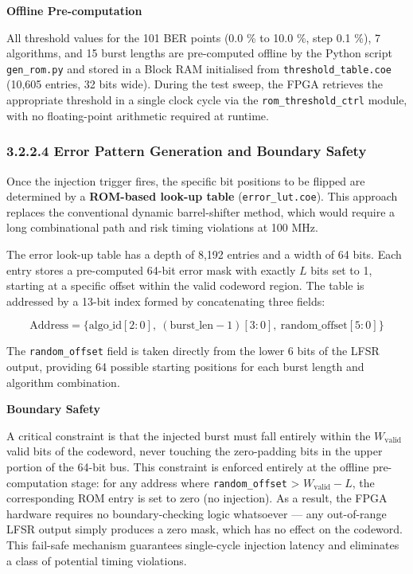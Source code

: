 \documentclass[
  12pt,
  a4paper]{report}
\begin{document}
\textbf{Offline Pre-computation}

All threshold values for the 101 BER points (0.0 \% to 10.0 \%, step 0.1
\%), 7 algorithms, and 15 burst lengths are pre-computed offline by the
Python script \texttt{gen\_rom.py} and stored in a Block RAM initialised
from \texttt{threshold\_table.coe} (10,605 entries, 32 bits wide).
During the test sweep, the FPGA retrieves the appropriate threshold in a
single clock cycle via the \texttt{rom\_threshold\_ctrl} module, with no
floating-point arithmetic required at runtime.

\subsubsection{3.2.2.4 Error Pattern Generation and Boundary
Safety}\label{error-pattern-generation-and-boundary-safety}

Once the injection trigger fires, the specific bit positions to be
flipped are determined by a \textbf{ROM-based look-up table}
(\texttt{error\_lut.coe}). This approach replaces the conventional
dynamic barrel-shifter method, which would require a long combinational
path and risk timing violations at 100 MHz.

The error look-up table has a depth of 8,192 entries and a width of 64
bits. Each entry stores a pre-computed 64-bit error mask with exactly
\(L\) bits set to 1, starting at a specific offset within the valid
codeword region. The table is addressed by a 13-bit index formed by
concatenating three fields:

\[\text{Address} = \{ \text{algo\_id}[2:0],\ (\text{burst\_len} - 1)[3:0],\ \text{random\_offset}[5:0] \}\]

The \texttt{random\_offset} field is taken directly from the lower 6
bits of the LFSR output, providing 64 possible starting positions for
each burst length and algorithm combination.

\textbf{Boundary Safety}

A critical constraint is that the injected burst must fall entirely
within the \(W_{\text{valid}}\) valid bits of the codeword, never
touching the zero-padding bits in the upper portion of the 64-bit bus.
This constraint is enforced entirely at the offline pre-computation
stage: for any address where \texttt{random\_offset} \textgreater{}
\(W_{\text{valid}} - L\), the corresponding ROM entry is set to zero (no
injection). As a result, the FPGA hardware requires no boundary-checking
logic whatsoever --- any out-of-range LFSR output simply produces a zero
mask, which has no effect on the codeword. This fail-safe mechanism
guarantees single-cycle injection latency and eliminates a class of
potential timing violations.
\end{document}
